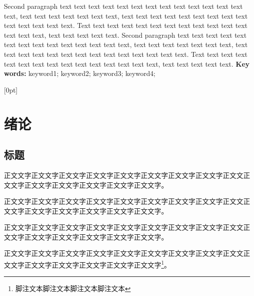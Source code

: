 \documentclass[
	StudentName     = 孙敬垚,
	StudentNameEng	= {{Name of Graduate (such as HAN Bao-cheng)}},
	AdvisorName     = {{冯兴杰 教授}},
	AdvisorNameEng	= {{Name of Supervisor and Title (such as Prof. FENG Chang-gen)}},
        AdvisorNameEngSecond = {{Name of Second Supervisor and Title}},
	StudentID		= XXXXX,
	Major           = ,
	ResearchInterest= ,
	Department		= XXXX学院,
	DepartmentEng	= {{Name of Department (or School)}},
	SubmitYear		= 202X,
	SubmitMonth		= X,
	SubmitDay		= XX,
	DefenseYear		= 202X,
	DefenseMonth	= X,
	DefenseDay		= XX,
	DefenseDateEng	= {{Date of Submit (such as April 2002)}},
	Title           = I2TDM,
	TitleEng        = {{English Title}},
	CLCNumber		= TD235,
	UDCNumber		= 624.152.5
]{cauc_thesis}
\begin{document}
    Second paragraph text text text text text text text text text text text text text text, text text text text text text text, text text text text text text text text text text text text text text. Text text text text text text text text text text text text text text text, text text text text text. Second paragraph text text text text text text text text text text text text text text, text text text text text text text, text text text text text text text text text text text text text text. Text text text text text text text text text text text text text text text, text text text text text.
\newline
{}\textbf{Key words: }\songti keyword1; keyword2; keyword3; keyword4;

\clearpage
\newpage
{}
\pagestyle{fancy}
[0pt] %
{\vspace{-50pt}\centering\Large\bfseries} %
{}
{}
{\vspace{20pt}} %
\tableofcontents

\newpage
\setcounter{page}{1}


\setlength{\headsep}{0.624cm}
\pagestyle{fancy}
\setlength{\baselineskip}{23.4pt}
{\centering\chapter{绪论}}
\setlength{\baselineskip}{23.4pt}
\section{标题}
正文文字正文文字正文文字正文文字正文文字正文文字正文文字正文文字正文文正文文字正文文字正文文字正文文字正文文字正文文字。

正文文字正文文字正文文字正文文字正文文字正文文字正文文字正文文字正文文正文文字正文文字正文文字正文文字正文文字正文文字。

正文文字正文文字正文文字正文文字正文文字正文文字正文文字正文文字正文文正文文字正文文字正文文字正文文字正文文字正文文字。

正文文字正文文字正文文字正文文字正文文字正文文字正文文字正文文字正文文正文文字正文文字正文文字正文文字正文文字正文文字\footnote{脚注文本脚注文本脚注文本脚注文本}。
\end{document}
